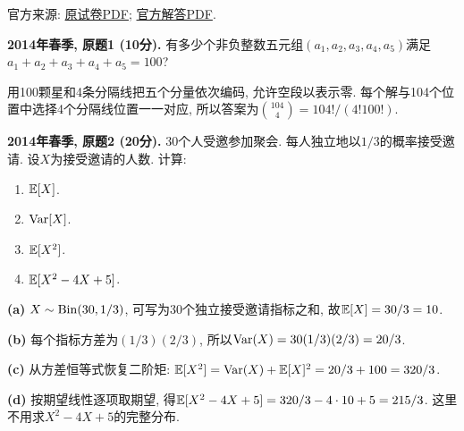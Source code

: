 \noindent 官方来源: \href{https://ocw.mit.edu/courses/18-600-probability-and-random-variables-fall-2019/d88a1f88b725d3ec75144e5dd130fd55_MIT18_600F19_mid1_2014.pdf}{原试卷PDF}; \href{https://ocw.mit.edu/courses/18-600-probability-and-random-variables-fall-2019/1c1579e396bb44c47ca34dd6f5f2e6ba_MIT18_600F19_mid1_2014_soln.pdf}{官方解答PDF}.
\begin{exercise}\label{ex:m1-2014s-q1}
\textbf{2014年春季, 原题1 (10分).} 有多少个非负整数五元组$(a_1,a_2,a_3,a_4,a_5)$满足$a_1+a_2+a_3+a_4+a_5=100$?
\end{exercise}
\begin{solution}
\label{sol:m1-2014s-q1}
用100颗星和4条分隔线把五个分量依次编码, 允许空段以表示零. 每个解与104个位置中选择4个分隔线位置一一对应, 所以答案为$\binom{104}{4}=104!/(4!100!)$.
\end{solution}

\begin{exercise}\label{ex:m1-2014s-q2}
\textbf{2014年春季, 原题2 (20分).} 30个人受邀参加聚会. 每人独立地以$1/3$的概率接受邀请. 设$X$为接受邀请的人数. 计算:
\begin{enumerate}\item[(a)]\label{ex:m1-2014s-q2-a} $\mathbb E[X]$.\item[(b)]\label{ex:m1-2014s-q2-b} $\operatorname{Var}[X]$.\item[(c)]\label{ex:m1-2014s-q2-c} $\mathbb E[X^2]$.\item[(d)]\label{ex:m1-2014s-q2-d} $\mathbb E[X^2-4X+5]$.\end{enumerate}
\end{exercise}
\begin{solution}
\textbf{(a)}\label{sol:m1-2014s-q2-a} $X\sim\operatorname{Bin}(30,1/3)$, 可写为30个独立接受邀请指标之和, 故$\mathbb E[X]=30/3=10$.

\textbf{(b)}\label{sol:m1-2014s-q2-b} 每个指标方差为$(1/3)(2/3)$, 所以$\operatorname{Var}(X)=30(1/3)(2/3)=20/3$.

\textbf{(c)}\label{sol:m1-2014s-q2-c} 从方差恒等式恢复二阶矩: $\mathbb E[X^2]=\operatorname{Var}(X)+\mathbb E[X]^2=20/3+100=320/3$.

\textbf{(d)}\label{sol:m1-2014s-q2-d} 按期望线性逐项取期望, 得$\mathbb E[X^2-4X+5]=320/3-4\cdot10+5=215/3$. 这里不用求$X^2-4X+5$的完整分布.
\end{solution}

